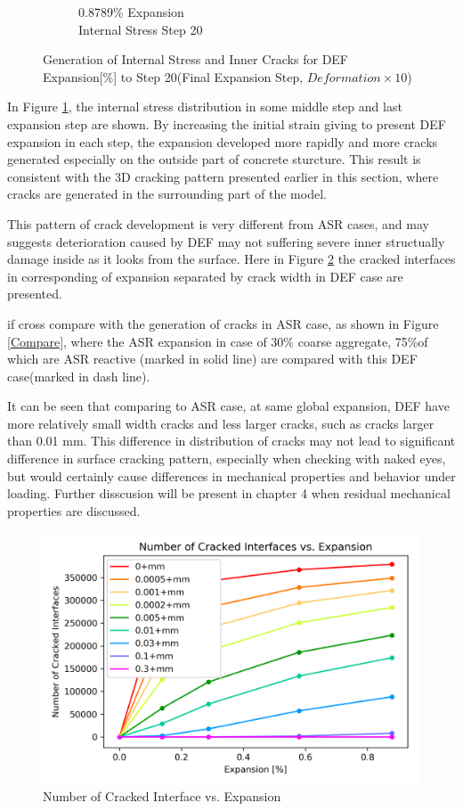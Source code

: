 \begin{figure}[h!]
\begin{subfigure}{.25\textwidth}
      \caption{0.8789\% Expansion\\Internal Stress Step 20}
    \end{subfigure}

    

\caption{Generation of Internal Stress and Inner Cracks for DEF Expansion[\%] to Step 20(Final Expansion Step, $Deformation \times 10$)}
\label{fig:A30_X0C_stress}
\end{figure}

In Figure \ref{fig:A30_X0C_stress}, the internal stress distribution in some middle step and last expansion step are shown. By increasing the initial strain giving to present DEF expansion in each step, the expansion developed more rapidly and more cracks generated especially on the outside part of concrete sturcture. This result is consistent with the 3D cracking pattern presented earlier in this section, where cracks are generated in the surrounding part of the model.

\clearpage

This pattern of crack development is very different from ASR cases, and may suggests deterioration caused by DEF  may not suffering severe inner structually damage inside as it looks from the surface. Here in Figure \ref{A30X0CCRACKKK} the cracked interfaces in corresponding of expansion separated by crack width in DEF case are presented.

if cross compare with the generation of cracks in ASR case, as shown in Figure \ref{Compare}, where the ASR expansion in case of 30\% coarse aggregate, 75\%of which are ASR reactive (marked in solid line) are compared with this DEF case(marked in dash line).

It can be seen that comparing to ASR case, at same global expansion, DEF have more relatively small width cracks and less larger cracks, such as cracks larger than 0.01 mm. This difference in distribution of cracks may not lead to significant difference in surface cracking pattern, especially when checking with naked eyes, but would certainly cause differences in mechanical properties and behavior under loading. Further disscusion will be present in chapter 4 when residual mechanical properties are discussed.

\begin{figure}[ht!]
\centering
\includegraphics[width=.8\linewidth]{Files/interface/A30X0CCRACK.png}
  \caption{Number of Cracked Interface vs. Expansion}
  \label{A30X0CCRACKKK}
\end{figure}

